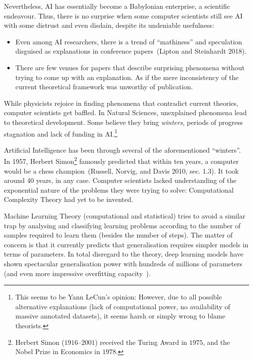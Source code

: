 \documentclass[
  letterpaper,
]{tufte-book}
\begin{document}
Nevertheless, {AI} has essentially become a Babylonian enterprise, a
scientific endeavour. Thus, there is no surprise when some computer
scientists still see AI with some distrust and even disdain, despite its
undeniable usefulness:

\begin{itemize}
\item
  Even among AI researchers, there is a trend of ``mathiness'' and
  speculation disguised as explanations in conference papers~(Lipton and
  Steinhardt 2018).
\item
  There are few venues for papers that describe surprising phenomena
  without trying to come up with an explanation. As if the mere
  inconsistency of the current theoretical framework was unworthy of
  publication.
\end{itemize}

While physicists rejoice in finding phenomena that contradict current
theories, computer scientists get baffled. In Natural Sciences,
unexplained phenomena lead to theoretical development. Some believe they
bring \emph{winters}, periods of progress stagnation and lack of funding
in {AI}.\footnote{This seems to be Yann LeCun's opinion: However, due to
  all possible alternative explanations (lack of computational power, no
  availability of massive annotated datasets), it seems harsh or simply
  wrong to blame theorists.}

Artificial Intelligence has been through several of the aforementioned
``winters''. In 1957, Herbert Simon\footnote{Herbert Simon
  (\(1916\)--\(2001\)) received the Turing Award in \(1975\), and the
  Nobel Prize in Economics in \(1978\).} famously predicted that within
ten years, a computer would be a chess champion~(Russell, Norvig, and
Davis 2010, sec. 1.3). It took around 40 years, in any case. Computer
scientists lacked understanding of the exponential nature of the
problems they were trying to solve: Computational Complexity Theory had
yet to be invented.

Machine Learning Theory (computational and statistical) tries to avoid a
similar trap by analysing and classifying learning problems according to
the number of samples required to learn them (besides the number of
steps). The matter of concern is that it currently predicts that
generalisation requires simpler models in terms of parameters. In total
disregard to the theory, deep learning models have shown spectacular
generalisation power with hundreds of millions of parameters (and even
more impressive overfitting capacity~).
\end{document}
